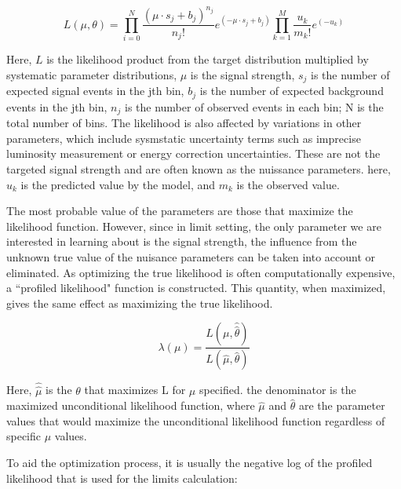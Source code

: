 \begin{equation}
    L(\mu, \theta) =  \prod_{i=0}^{N} \frac{(\mu \cdot s_{j} + b_{j})^{n_j}}{n_{j}!}e^{(-\mu \cdot s_j + b_j)} \prod_{k=1}^{M}\frac{u_{k}}
{m_{k}!} e^{(-u_{k})}
\label{eq:likelihood}
\end{equation}

Here, $L$ is the likelihood product from the target distribution multiplied by systematic parameter distributions, $\mu$ is the signal strength, $s_j$ is the number of expected signal events in the jth bin, $b_j$ is the number of expected background events in the jth  bin, $n_j$ is the number of observed events in each bin; N is the total number of bins. The likelihood is also affected by variations in other parameters, which include sysmstatic uncertainty terms such as imprecise luminosity measurement or energy correction uncertainties. These are not the targeted signal strength and are often known as the nuissance parameters. here, $u_k$ is the predicted value by the model, and $m_{k}$ is the observed value. 


The most probable value of the parameters are those that maximize the likelihood function. However, since in limit setting, the only parameter we are interested in learning about is the signal strength, the influence from the unknown true value of the nuisance parameters can be taken into account or eliminated. As optimizing the true likelihood is often computationally expensive, a ``profiled likelihood" function is constructed. This quantity, when maximized, gives the same effect as maximizing the true likelihood. 

\begin{equation}
\lambda(\mu) = \frac{L(\mu, \hat{\hat{\theta}})}{L(\hat{\mu}, \hat{\theta})}
\label{eq:profilelikelihood}
\end{equation}

Here, $\hat{\hat{\mu}}$ is the $\theta$ that maximizes L for $\mu$ specified. the denominator is the maximized unconditional likelihood function, where $\hat{\mu}$ and $\hat{\theta}$ are the parameter values that would maximize the unconditional likelihood function regardless of specific $\mu$ values.

To aid the optimization process, it is usually the negative log of the profiled likelihood that is used for the limits calculation:

